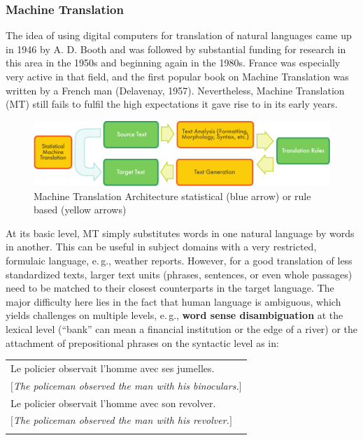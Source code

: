 \begin{multicols}{2}
\subsubsection{Machine Translation}
The idea of using digital computers for translation of natural
languages came up in 1946 by A. D. Booth and was followed by
substantial funding for research in this area in the 1950s and
beginning again in the 1980s. France was especially very active in
that field, and the first popular book on Machine Translation was
written by a French man (Delavenay, 1957). Nevertheless, Machine
Translation (MT) still fails to fulfil the high expectations it gave
rise to in its early years.

\begin{figure}
\begin{center}
 \includegraphics[width=\textwidth]{../_media/english/machine_translation}
\caption{Machine Translation Architecture statistical (blue arrow) or rule based (yellow arrows)}
\label{fig:mtarchiEng}
\end{center}
\end{figure}

At its basic level, MT simply substitutes words in one natural
language by words in another. This can be useful in subject domains
with a very restricted, formulaic language, e.\,g., weather
reports. However, for a good translation of less standardized texts,
larger text units (phrases, sentences, or even whole passages) need to
be matched to their closest counterparts in the target language. The
major difficulty here lies in the fact that human language is
ambiguous, which yields challenges on multiple levels, e.\,g., {\bf word
sense disambiguation} at the lexical level (``bank'' can mean a financial institution or the edge of a river) or the attachment of prepositional phrases on the syntactic
level as in:
\begin{tabular}{l}
\\
Le policier observait l'homme avec ses jumelles.\\
$[${\em The policeman observed the man with his binoculars.}$]$\\
Le policier observait l'homme avec son revolver.\\
$[${\em The policeman observed the man with his revolver.}$]$\\
\\
\end{tabular}


\end{multicols}
